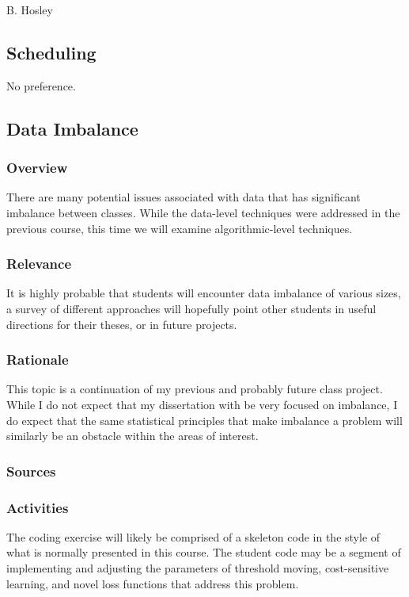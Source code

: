 \documentclass[12pt]{amsart}
\begin{document}
\raggedbottom

\hspace{\fill} {\large B. Hosley}
\bigskip


\subsection{Scheduling}

No preference. \\

\subsection{Data Imbalance}

\subsubsection{Overview}
There are many potential issues associated with data that has significant imbalance between classes. 
While the data-level techniques were addressed in the previous course, 
this time we will examine algorithmic-level techniques.

\subsubsection{Relevance}
It is highly probable that students will encounter data imbalance of various sizes,
a survey of different approaches will hopefully point other students in useful directions
for their theses, or in future projects.

\subsubsection{Rationale}
This topic is a continuation of my previous and probably future class project.
While I do not expect that my dissertation with be very focused on imbalance, 
I do expect that the same statistical principles that make imbalance a problem
will similarly be an obstacle within the areas of interest.

\subsubsection{Sources}

\subsubsection{Activities}
The coding exercise will likely be comprised of a skeleton code in the style of what 
is normally presented in this course.
The student code may be a segment of implementing and adjusting the parameters 
of threshold moving, cost-sensitive learning, and novel loss functions that address this problem.
\end{document}
